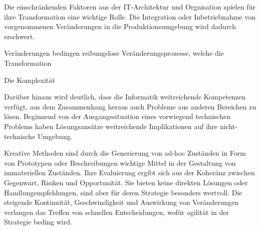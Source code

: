 Die einschränkenden Faktoren aus der IT-Architektur und Orgnisation spielen für ihre Transformation eine wichtige Rolle. Die Integration oder Inbetriebnahme von vorgenommenen Veränderungen in die Produktionsumgebung wird dadurch erschwert. 

Veränderungen bedingen reibungslose Veränderungsprozesse, welche die Transformation 


Die Komplexität

Darüber hinaus wird deutlich, dass die Informatik weitreichende Kompetenzen verfügt, aus dem Zusammenhang heraus auch Probleme aus anderen Bereichen zu lösen. Beginnend von der Ausgangssituation eines vorwiegend technischen Problems haben Lösungsansätze weitreichende Implikationen auf ihre nicht-technische Umgebung.

Kreative Methoden sind durch die Generierung von ad-hoc Zuständen in Form von Prototypen oder Beschreibungen wichtige Mittel in der Gestaltung von immateriellen Zuständen. Ihre Evaluierung ergibt sich aus der Koheränz zwischen Gegenwart, Risiken und Opportunität. Sie bieten keine direkten Lösungen oder Handlungempfehlungen, sind aber für deren Strategie besonders wertvoll. Die steigende Kontinuität, Geschwindigkeit und Auswirkung von Veränderungen verlangen das Treffen von schnellen Entscheidungen, wofür agilität in der Strategie beding wird.